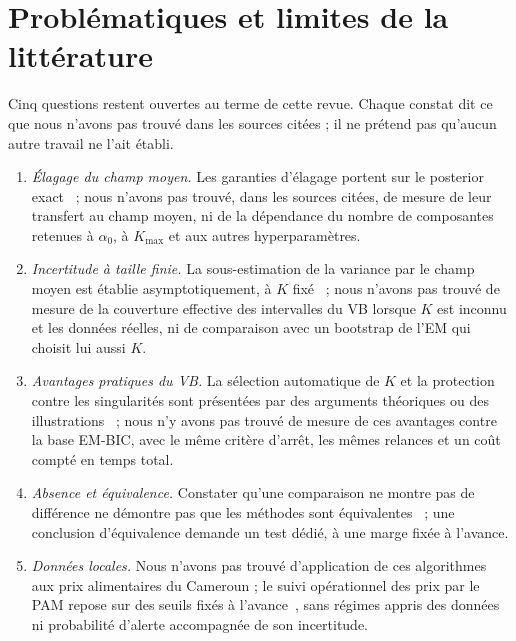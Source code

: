 \section{Problématiques et limites de la littérature}\label{sec:ea_limites}
Cinq questions restent ouvertes au terme de cette revue. Chaque constat dit ce que nous n'avons pas trouvé dans les sources citées ; il ne prétend pas qu'aucun autre travail ne l'ait établi.
\begin{enumerate}
\item \emph{Élagage du champ moyen.} Les garanties d'élagage portent sur le posterior exact~\cite{rousseau2011} ; nous n'avons pas trouvé, dans les sources citées, de mesure de leur transfert au champ moyen, ni de la dépendance du nombre de composantes retenues à $\alpha_0$, à $K_{\max}$ et aux autres hyperparamètres.
\item \emph{Incertitude à taille finie.} La sous-estimation de la variance par le champ moyen est établie asymptotiquement, à $K$ fixé~\cite{wang2005,blei2017} ; nous n'avons pas trouvé de mesure de la couverture effective des intervalles du VB lorsque $K$ est inconnu et les données réelles, ni de comparaison avec un bootstrap de l'EM qui choisit lui aussi $K$.
\item \emph{Avantages pratiques du VB.} La sélection automatique de $K$ et la protection contre les singularités sont présentées par des arguments théoriques ou des illustrations~\cite{bishop2006,corduneanu2001} ; nous n'y avons pas trouvé de mesure de ces avantages contre la base EM-BIC, avec le même critère d'arrêt, les mêmes relances et un coût compté en temps total.
\item \emph{Absence et équivalence.} Constater qu'une comparaison ne montre pas de différence ne démontre pas que les méthodes sont équivalentes~\cite{lakens2017} ; une conclusion d'équivalence demande un test dédié, à une marge fixée à l'avance.
\item \emph{Données locales.} Nous n'avons pas trouvé d'application de ces algorithmes aux prix alimentaires du Cameroun ; le suivi opérationnel des prix par le PAM repose sur des seuils fixés à l'avance~\cite{pam2014alps}, sans régimes appris des données ni probabilité d'alerte accompagnée de son incertitude.
\end{enumerate}


